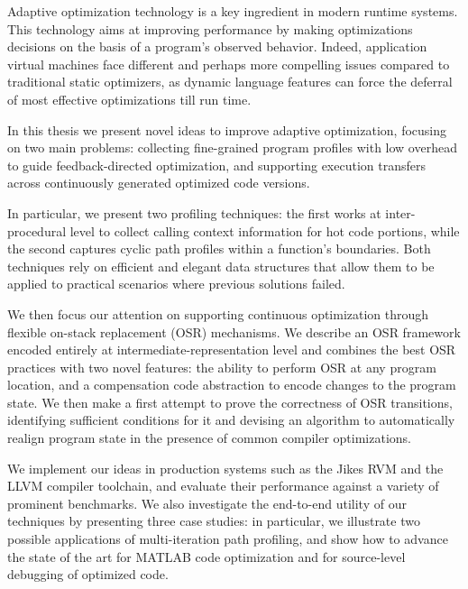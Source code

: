 Adaptive optimization technology is a key ingredient in modern runtime systems. This technology aims at improving performance by making optimizations decisions on the basis of a program's observed behavior. Indeed, application virtual machines face different and perhaps more compelling issues compared to traditional static optimizers, as dynamic language features can force the deferral of most effective optimizations till run time.

In this thesis we present novel ideas to improve adaptive optimization, focusing on two main problems: collecting fine-grained program profiles with low overhead to guide feedback-directed optimization, and supporting execution transfers across continuously generated optimized code versions.

In particular, we present two profiling techniques: the first works at inter-procedural level to collect calling context information for hot code portions, while the second captures cyclic path profiles within a function's boundaries. Both techniques rely on efficient and elegant data structures that allow them to be applied to practical scenarios where previous solutions failed.

We then focus our attention on supporting continuous optimization through flexible on-stack replacement (OSR) mechanisms. We describe an OSR framework encoded entirely at intermediate-representation level and combines the best OSR practices with two novel features: the ability to perform OSR at any program location, and a compensation code abstraction to encode changes to the program state. We then make a first attempt to prove the correctness of OSR transitions, identifying sufficient conditions for it and devising an algorithm to automatically realign program state in the presence of common compiler optimizations.

We implement our ideas in production systems such as the Jikes RVM and the LLVM compiler toolchain, and evaluate their performance against a variety of prominent benchmarks. We also investigate the end-to-end utility of our techniques by presenting three case studies: in particular, we illustrate two possible applications of multi-iteration path profiling, and show how to advance the state of the art for MATLAB code optimization and for source-level debugging of optimized code.


